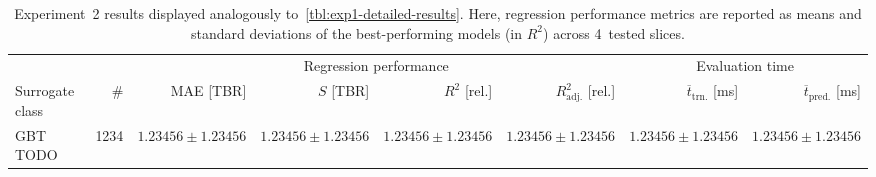 \begin{table}[h]
	\centering
	{\footnotesize
		\begin{tabular}{lrrrrrrr}
		\toprule
		{} & {} & \multicolumn{4}{c}{Regression performance} &
		\multicolumn{2}{c}{Evaluation time}\\
		\cmidrule(lr){3-6}
		\cmidrule(lr){7-8}
		Surrogate class & \# & MAE [TBR] & $S$ [TBR] & $R^2$ [rel.] & $R^2_{\text{adj.}}$ [rel.]
						& $\overline{t}_{\text{trn.}}$ [ms] &
						$\overline{t}_{\text{pred.}}$ [ms]\\
		\midrule
		GBT TODO
						& \num{1234}
						& $\num{1.23456} \pm \num{1.23456}$
						& $\num{1.23456} \pm \num{1.23456}$
						& $\num{1.23456} \pm \num{1.23456}$
						& $\num{1.23456} \pm \num{1.23456}$
						& $\num{1.23456} \pm \num{1.23456}$
						& $\num{1.23456} \pm \num{1.23456}$
		\\
		\bottomrule
		\end{tabular}
	}
	\caption{Experiment~2 results displayed analogously
		to~\cref{tbl:exp1-detailed-results}. Here, regression performance
		metrics are reported as means and standard deviations of the best-performing
		models (in $R^2$) across 4~tested slices.}
	\label{tbl:exp2-detailed-results}
\end{table}
